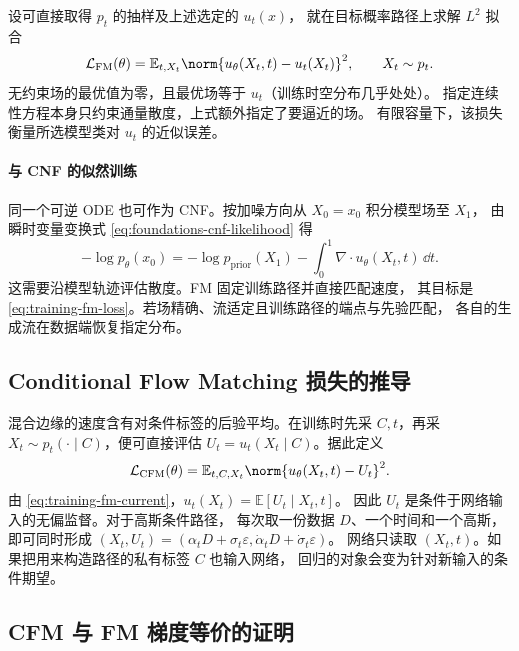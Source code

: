 设可直接取得 \(p_t\) 的抽样及上述选定的 \(u_t(x)\)，
就在目标概率路径上求解 \(L^2\) 拟合
\begin{equation}
  \mathcal L_{\mathrm{FM}}(\theta)
    =\mathbb E_{t,X_t}\norm{u_\theta(X_t,t)-u_t(X_t)}^2 ,
  \qquad X_t\sim p_t.
  \label{eq:training-fm-loss}
\end{equation}
无约束场的最优值为零，且最优场等于 \(u_t\)（训练时空分布几乎处处）。
指定连续性方程本身只约束通量散度，上式额外指定了要逼近的场。
有限容量下，该损失衡量所选模型类对 \(u_t\) 的近似误差。

\paragraph{与 CNF 的似然训练}
同一个可逆 ODE 也可作为 CNF。按加噪方向从 \(X_0=x_0\) 积分模型场至 \(X_1\)，
由瞬时变量变换式 \eqref{eq:foundations-cnf-likelihood} 得
\[
  -\log p_\theta(x_0)=-\log p_{\mathrm{prior}}(X_1)
               -\int_0^1\nabla\cdot u_\theta(X_t,t)\,\dd t .
\]
这需要沿模型轨迹评估散度。FM 固定训练路径并直接匹配速度，
其目标是 \eqref{eq:training-fm-loss}。若场精确、流适定且训练路径的端点与先验匹配，
各自的生成流在数据端恢复指定分布。

\subsection{Conditional Flow Matching 损失的推导\requiredderivation}
\label{subsec:cfm-loss}

混合边缘的速度含有对条件标签的后验平均。在训练时先采
\(C,t\)，再采 \(X_t\sim p_t(\cdot\mid C)\)，便可直接评估
\(U_t=u_t(X_t\mid C)\)。据此定义
\begin{equation}
  \mathcal L_{\mathrm{CFM}}(\theta)
      =\mathbb E_{t,C,X_t}\norm{u_\theta(X_t,t)-U_t}^2 .
  \label{eq:training-cfm-loss}
\end{equation}
由 \eqref{eq:training-fm-current}，\(u_t(X_t)=\mathbb E[U_t\mid X_t,t]\)。
因此 \(U_t\) 是条件于网络输入的无偏监督。对于高斯条件路径，
每次取一份数据 \(D\)、一个时间和一个高斯，即可同时形成
\((X_t,U_t)=(\alpha_tD+\sigma_t\varepsilon,\dot\alpha_tD+\dot\sigma_t\varepsilon)\)。
网络只读取 \((X_t,t)\)。如果把用来构造路径的私有标签 \(C\) 也输入网络，
回归的对象会变为针对新输入的条件期望。

\subsection{CFM 与 FM 梯度等价的证明\requiredderivation}

